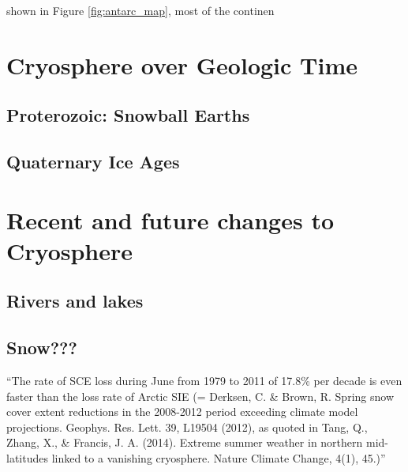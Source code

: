  shown in Figure \ref{fig:antarc_map}, most of the continen %

\section{Cryosphere over Geologic Time}
\subsection{Proterozoic: Snowball Earths}
\subsection{Quaternary Ice Ages}

\section{Recent and future changes to Cryosphere}
\subsection{Rivers and lakes}
\subsection{Snow???}
``The rate of SCE loss during June from 1979 to 2011 of 17.8\% per decade is even faster than the loss rate of Arctic SIE (= Derksen, C. \& Brown, R. Spring snow cover extent reductions in the 2008-2012 period exceeding climate model projections. Geophys. Res. Lett. 39, L19504 (2012), as quoted in Tang, Q., Zhang, X., \& Francis, J. A. (2014). Extreme summer weather in northern mid-latitudes linked to a vanishing cryosphere. Nature Climate Change, 4(1), 45.)''

